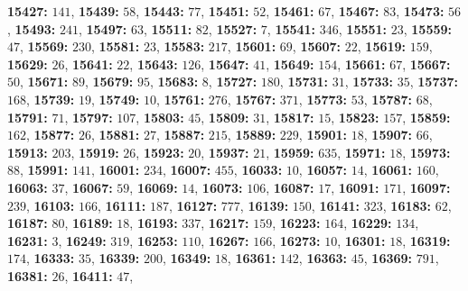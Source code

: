 \textsf{\bfseries 15427:} $141$, \textsf{\bfseries 15439:} $58$, \textsf{\bfseries 15443:} $77$, \textsf{\bfseries 15451:} $52$, \textsf{\bfseries 15461:} $67$, \textsf{\bfseries 15467:} $83$, \textsf{\bfseries 15473:} $56$, \textsf{\bfseries 15493:} $241$, \textsf{\bfseries 15497:} $63$, \textsf{\bfseries 15511:} $82$, \textsf{\bfseries 15527:} $7$, \textsf{\bfseries 15541:} $346$, \textsf{\bfseries 15551:} $23$, \textsf{\bfseries 15559:} $47$, \textsf{\bfseries 15569:} $230$, \textsf{\bfseries 15581:} $23$, \textsf{\bfseries 15583:} $217$, \textsf{\bfseries 15601:} $69$, \textsf{\bfseries 15607:} $22$, \textsf{\bfseries 15619:} $159$, \textsf{\bfseries 15629:} $26$, \textsf{\bfseries 15641:} $22$, \textsf{\bfseries 15643:} $126$, \textsf{\bfseries 15647:} $41$, \textsf{\bfseries 15649:} $154$, \textsf{\bfseries 15661:} $67$, \textsf{\bfseries 15667:} $50$, \textsf{\bfseries 15671:} $89$, \textsf{\bfseries 15679:} $95$, \textsf{\bfseries 15683:} $8$, \textsf{\bfseries 15727:} $180$, \textsf{\bfseries 15731:} $31$, \textsf{\bfseries 15733:} $35$, \textsf{\bfseries 15737:} $168$, \textsf{\bfseries 15739:} $19$, \textsf{\bfseries 15749:} $10$, \textsf{\bfseries 15761:} $276$, \textsf{\bfseries 15767:} $371$, \textsf{\bfseries 15773:} $53$, \textsf{\bfseries 15787:} $68$, \textsf{\bfseries 15791:} $71$, \textsf{\bfseries 15797:} $107$, \textsf{\bfseries 15803:} $45$, \textsf{\bfseries 15809:} $31$, \textsf{\bfseries 15817:} $15$, \textsf{\bfseries 15823:} $157$, \textsf{\bfseries 15859:} $162$, \textsf{\bfseries 15877:} $26$, \textsf{\bfseries 15881:} $27$, \textsf{\bfseries 15887:} $215$, \textsf{\bfseries 15889:} $229$, \textsf{\bfseries 15901:} $18$, \textsf{\bfseries 15907:} $66$, \textsf{\bfseries 15913:} $203$, \textsf{\bfseries 15919:} $26$, \textsf{\bfseries 15923:} $20$, \textsf{\bfseries 15937:} $21$, \textsf{\bfseries 15959:} $635$, \textsf{\bfseries 15971:} $18$, \textsf{\bfseries 15973:} $88$, \textsf{\bfseries 15991:} $141$, \textsf{\bfseries 16001:} $234$, \textsf{\bfseries 16007:} $455$, \textsf{\bfseries 16033:} $10$, \textsf{\bfseries 16057:} $14$, \textsf{\bfseries 16061:} $160$, \textsf{\bfseries 16063:} $37$, \textsf{\bfseries 16067:} $59$, \textsf{\bfseries 16069:} $14$, \textsf{\bfseries 16073:} $106$, \textsf{\bfseries 16087:} $17$, \textsf{\bfseries 16091:} $171$, \textsf{\bfseries 16097:} $239$, \textsf{\bfseries 16103:} $166$, \textsf{\bfseries 16111:} $187$, \textsf{\bfseries 16127:} $777$, \textsf{\bfseries 16139:} $150$, \textsf{\bfseries 16141:} $323$, \textsf{\bfseries 16183:} $62$, \textsf{\bfseries 16187:} $80$, \textsf{\bfseries 16189:} $18$, \textsf{\bfseries 16193:} $337$, \textsf{\bfseries 16217:} $159$, \textsf{\bfseries 16223:} $164$, \textsf{\bfseries 16229:} $134$, \textsf{\bfseries 16231:} $3$, \textsf{\bfseries 16249:} $319$, \textsf{\bfseries 16253:} $110$, \textsf{\bfseries 16267:} $166$, \textsf{\bfseries 16273:} $10$, \textsf{\bfseries 16301:} $18$, \textsf{\bfseries 16319:} $174$, \textsf{\bfseries 16333:} $35$, \textsf{\bfseries 16339:} $200$, \textsf{\bfseries 16349:} $18$, \textsf{\bfseries 16361:} $142$, \textsf{\bfseries 16363:} $45$, \textsf{\bfseries 16369:} $791$, \textsf{\bfseries 16381:} $26$, \textsf{\bfseries 16411:} $47$, 
